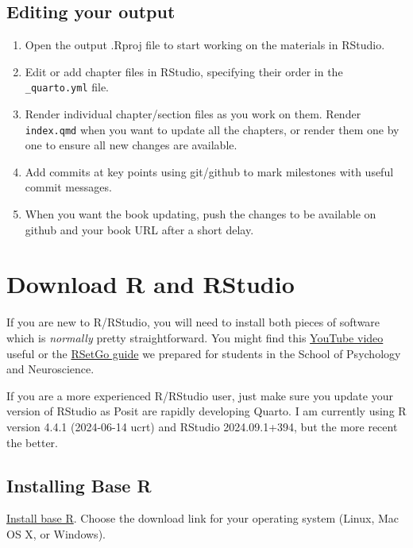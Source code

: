 \documentclass[
  letterpaper,
  DIV=11,
  numbers=noendperiod]{scrreprt}
\begin{document}
\subsection{Editing your output}\label{editing-your-output}

\begin{enumerate}
\def\labelenumi{\arabic{enumi}.}
\item
  Open the output .Rproj file to start working on the materials in
  RStudio.
\item
  Edit or add chapter files in RStudio, specifying their order in the
  \texttt{\_quarto.yml} file.
\item
  Render individual chapter/section files as you work on them. Render
  \texttt{index.qmd} when you want to update all the chapters, or render
  them one by one to ensure all new changes are available.
\item
  Add commits at key points using git/github to mark milestones with
  useful commit messages.
\item
  When you want the book updating, push the changes to be available on
  github and your book URL after a short delay.
\end{enumerate}

\section{Download R and RStudio}\label{download-r-and-rstudio}

If you are new to R/RStudio, you will need to install both pieces of
software which is \emph{normally} pretty straightforward. You might find
this \href{https://youtu.be/YrEe2TLr3MI?si=oweIE55Ul77ZoZwz}{YouTube
video} useful or the \href{https://psyteachr.github.io/RSetGo/}{RSetGo
guide} we prepared for students in the School of Psychology and
Neuroscience.

If you are a more experienced R/RStudio user, just make sure you update
your version of RStudio as Posit are rapidly developing Quarto. I am
currently using R version 4.4.1 (2024-06-14 ucrt) and RStudio
2024.09.1+394, but the more recent the better.

\subsection{Installing Base R}\label{installing-base-r}

\href{https://cran.rstudio.com/}{Install base R}. Choose the download
link for your operating system (Linux, Mac OS X, or Windows).
\end{document}
